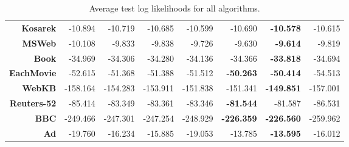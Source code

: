 \documentclass[xcolor={usenames,dvipsnames,svgnames}, compress]{beamer}
\begin{document}
\begin{frame}
\begin{table}[!htbp]
\begin{tabular}{r r r r r r r r}
      \textbf{Kosarek}    & -10.894           & -10.719        & -10.685         & -10.599          & -10.690           & \textbf{-10.578}  & -10.615          \\
      \textbf{MSWeb}      & -10.108           & -9.833         & -9.838          & -9.726           & -9.630            & \textbf{-9.614}   & -9.819           \\
      \textbf{Book}       & -34.969           & -34.306        & -34.280         & -34.136          & -34.366           & \textbf{-33.818}  & -34.694          \\
      \textbf{EachMovie}  & -52.615           & -51.368        & -51.388         & -51.512          & \textbf{-50.263}  & \textbf{-50.414}  & -54.513          \\
      \textbf{WebKB}      & -158.164          & -154.283       & -153.911        & -151.838         & -151.341          & \textbf{-149.851} & -157.001         \\
      \textbf{Reuters-52} & -85.414           & -83.349        & -83.361         & -83.346          & \textbf{-81.544}  & -81.587           & -86.531          \\
      \textbf{BBC}        & -249.466          & -247.301       & -247.254        & -248.929         & \textbf{-226.359} & \textbf{-226.560} & -259.962         \\
      \textbf{Ad}         & -19.760           & -16.234        & -15.885         & -19.053          & -13.785           & \textbf{-13.595}  & -16.012          \\
      \bottomrule
    \end{tabular}
    \caption[Experimentation results]{Average test
      log likelihoods for all algorithms.}
    \label{tab:resexp}
  \end{table}

\end{frame}
\end{document}
